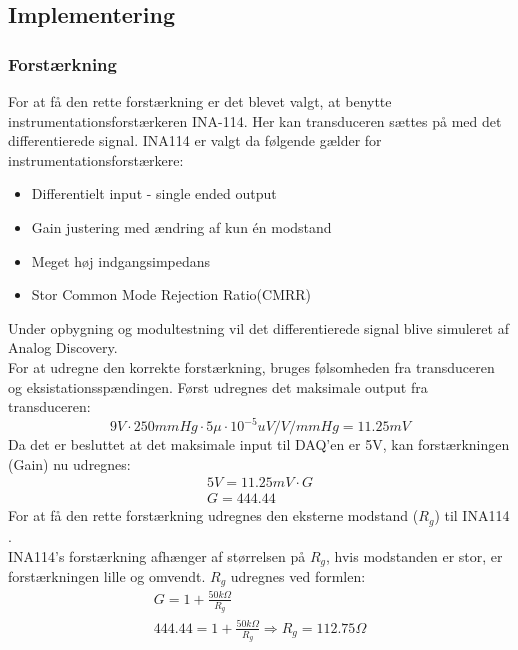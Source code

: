 \subsection{Implementering}
\subsubsection{Forstærkning}
For at få den rette forstærkning er det blevet valgt, at benytte instrumentationsforstærkeren INA-114. Her kan transduceren sættes på med det differentierede signal. INA114 er valgt da følgende gælder\cite{Instrumentation} for instrumentationsforstærkere: 
\begin{itemize}
	\item Differentielt input - single ended output 
	\item Gain justering med ændring af kun én modstand 
	\item Meget høj indgangsimpedans 
	\item Stor Common Mode Rejection Ratio(CMRR)
\end{itemize}
Under opbygning og modultestning vil det differentierede signal blive simuleret af Analog Discovery. \\
For at udregne den korrekte forstærkning, bruges følsomheden fra transduceren og eksistationsspændingen.
Først udregnes det maksimale output fra transduceren:   
\begin{equation}
9V\cdot 250mmHg \cdot 5\mu\cdot 10^{-5} uV/V/mmHg  = 11.25mV
\end{equation} 
Da det er besluttet at det maksimale input til DAQ'en \cite{DSB} er 5V, kan forstærkningen (Gain) nu udregnes: 
\begin{equation}
\begin{split}
5V= 11.25mV \cdot G \\
G = 444.44
\end{split}
\end{equation}
For at få den rette forstærkning udregnes den eksterne modstand ($ R_g $) til INA114 \cite{INA}.\\ 
INA114's forstærkning afhænger af størrelsen på $ R_g $, hvis modstanden er stor, er forstærkningen lille og omvendt.  $ R_g $ udregnes ved formlen: 
\begin{equation}
\begin{split}
G=1+\frac{50k\Omega}{R_g}\\
444.44= 1+\frac{50k\Omega}{R_g} \Rightarrow R_g= 112.75 \Omega
\end{split}
\end{equation}

